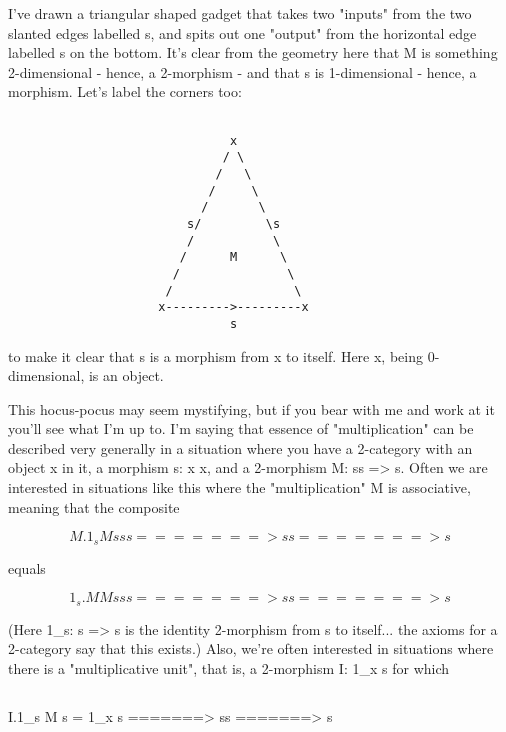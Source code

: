 I've drawn a triangular shaped gadget that takes two "inputs"
from the two slanted edges labelled s, and spits out one "output"
from the horizontal edge labelled s on the bottom.   It's clear
from the geometry here that M is something 2-dimensional - hence, a
2-morphism - and that s is 1-dimensional - hence, a morphism.
Let's label the corners too:


\begin{verbatim}

                               x
                              / \
                             /   \
                            /     \
                           /       \
                         s/         \s
                         /           \
                        /      M      \
                       /               \
                      /                 \
                     x--------->---------x
                               s

\end{verbatim}
    
to make it clear that s is a morphism from x to itself.  Here x,
being 0-dimensional, is an object. 

This hocus-pocus may seem mystifying, but if you bear with me and work
at it you'll see what I'm up to.  I'm saying that essence of
"multiplication" can be described very generally in a situation where
you have a 2-category with an object x in it, a morphism s: x \to  x, and
a 2-morphism M: ss => s.  Often we are interested in situations like
this where the "multiplication" M is associative, meaning that the
composite


$$

                  M.1_{s}          M
            sss =======> ss =======> s

$$
    
equals


$$

                  1_{s}.M         M
            sss =======> ss =======> s

$$
    
(Here 1_{s}: s => s is the identity 2-morphism from s to itself... the axioms
for a 2-category say that this exists.)  Also, we're often interested in
situations where there is a "multiplicative unit", that is, a 2-morphism
I: 1_{x} \to  s for which


$$

                         I.1_{s}         M
             s = 1_{x} s  =======> ss =======> s

